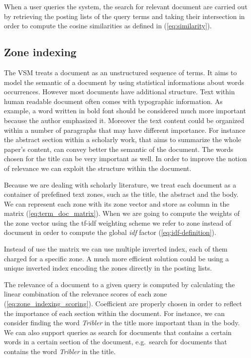 When a user queries the system, the search for relevant document are carried out by retrieving the posting lists of the query terms and taking their intersection in order to compute the cosine similarities as defined in (\ref{eq:similarity}).

\subsection{Zone indexing}\label{sec:zone_indexing}
The VSM treats a document as an unstructured sequence of terms. It aims to model the semantic of a document by using statistical informations about words occurrences. However most documents have additional structure. Text within human readable document often comes with typographic information. As example, a word written in bold font should be considered much more important because the author emphasized it. Moreover the text content could be organized within a number of paragraphs that may have different importance. For instance the abstract section within a scholarly work, that aims to summarize the whole paper's content, can convey better the semantic of the document. The words chosen for the title can be very important as well. In order to improve the notion of relevance we can exploit the structure within the document.

Because we are dealing with scholarly literature, we treat each document as a container of prefefined text zones, such as the title, the abstract and the body. We can represent each zone with its zone vector and store as column in the matrix  (\ref{eq:term_doc_matrix}). When we are going to compute the weights of the zone vector using the tf-idf weighting scheme we refer to zone instead of document in order to compute the global \emph{idf} factor (\ref{eq:idf-definition}).

Instead of use the matrix we can use multiple inverted index, each of them charged for a specific zone. A much more efficient solution could be using a unique inverted index encoding the zones directly in the posting lists.

The relevance of a document to a given query is computed by calculating the linear combination of the relevance scores of each zone (\ref{eq:zone_indexing_scoring}). Coefficient are properly chosen in order to reflect the importance of each section within the document. For instance, we can consider finding the word \emph{Tribler} in the title more important than in the body. We can also support queries as search for documents that contains a certain words in a certain section of the document, e.g.\ search for documents that contains the word \emph{Tribler} in the title.

